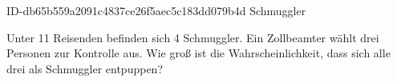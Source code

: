 \begin{exercise}
      {ID-db65b559a2091c4837ce26f5aec5c183dd079b4d}
      {Schmuggler}
  \ifproblem\problem\par
    Unter 11 Reisenden befinden sich 4 Schmuggler. Ein Zollbeamter wählt drei
    Personen zur Kontrolle aus. Wie groß ist die Wahrscheinlichkeit, dass sich
    alle drei als Schmuggler entpuppen?
  \fi
\end{exercise}
